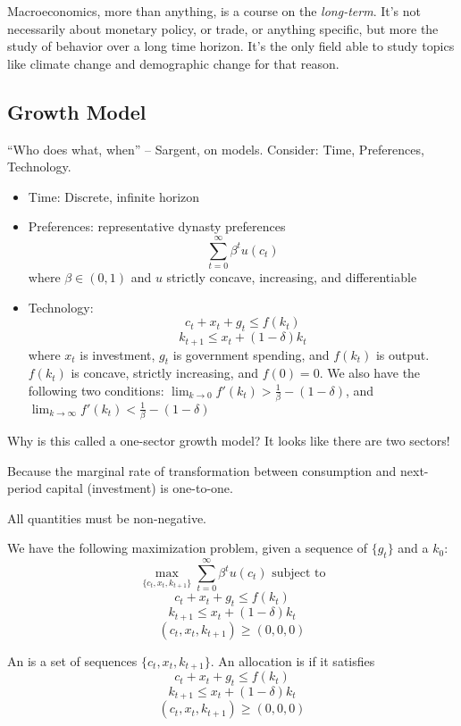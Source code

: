 \documentclass[10pt]{article}
\begin{document}
Macroeconomics, more than anything, is a course on the \emph{long-term}. It's not necessarily about monetary policy, or trade, or anything specific, but more the study of behavior over a long time horizon. It's the only field able to study topics like climate change and demographic change for that reason.

\subsection{Growth Model}

``Who does what, when'' -- Sargent, on models. Consider: Time, Preferences, Technology.

\begin{model}
	\begin{itemize}
		\item Time: Discrete, infinite horizon
		\item Preferences: representative dynasty preferences
		\[\sum_{t=0}^\infty \beta^t u(c_t)\] where $\beta \in (0,1)$ and $u$ strictly concave, increasing, and differentiable
		\item Technology: \[c_t+x_t+g_t \le f(k_t)\]\[k_{t+1}\le x_t+(1-\delta)k_t\] where $x_t$ is investment, $g_t$ is government spending, and $f(k_t)$ is output. $f(k_t)$ is concave, strictly increasing, and $f(0)=0$. We also have the following two conditions: $\lim_{k\to0}f'(k_t) > \frac{1}{\beta} - (1-\delta)$, and $\lim_{k\to\infty}f'(k_t) < \frac{1}{\beta} - (1-\delta)$
	\end{itemize}
	
	\begin{question}
		Why is this called a one-sector growth model? It looks like there are two sectors!
	\end{question}
	Because the marginal rate of transformation between consumption and next-period capital (investment) is one-to-one.
	
	\begin{assumption}
		All quantities must be non-negative.
	\end{assumption}
\end{model}

We have the following maximization problem, given a sequence of $\{g_t\}$ and a $k_0$:
\[\max_{\{c_t,x_t,k_{t+1}\}}\sum_{t=0}^\infty \beta^t u(c_t) \text{  subject to}\]\[c_t+x_t+g_t\le f(k_t)\]\[k_{t+1}\le x_t + (1-\delta)k_t\]\[(c_t,x_t,k_{t+1}) \ge (0,0,0)\]


\begin{definition}
	An  is a set of sequences $\{c_t,x_t,k_{t+1}\}$. An allocation is  if it satisfies \[c_t+x_t+g_t\le f(k_t)\]\[k_{t+1}\le x_t + (1-\delta)k_t\]\[(c_t,x_t,k_{t+1}) \ge (0,0,0)\]
\end{definition}
\end{document}
